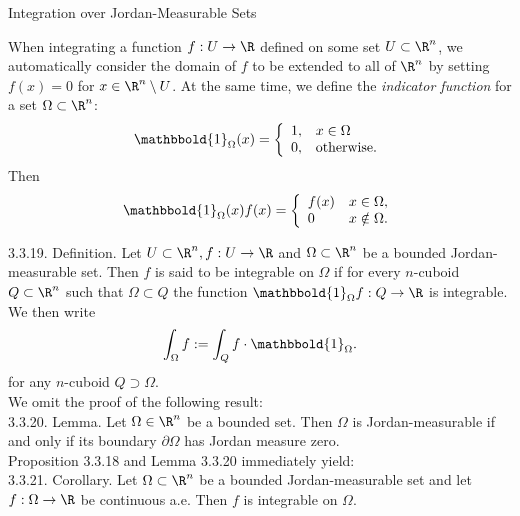\documentclass[smaller,hyperref={CJKbookmarks=true}]{beamer}
\begin{document}
\begin{frame}{Integration over Jordan-Measurable Sets}
\begin{spacing}{1.15}
When integrating a function $f:U\to\R$ defined on some set $U\subset\R^n$, we automatically consider the domain of $f$ to be extended to all of $\R^n$ by setting $f(x)=0$ for $x\in\R^n\setminus U$. At the same time, we define the \emph{indicator function} for a set $\Omega\subset\R^n$:
\[\mathbbold{1}_\Omega(x)=\left\{\begin{array}{ll}
                                   1, &x\in\Omega \\
                                   0, & \text{otherwise.}
                                 \end{array}\right.\]
Then
\[\mathbbold{1}_\Omega(x)f(x)=\left\{\begin{array}{ll}
                                       f(x) &x\in\Omega, \\
                                       0 & x\notin\Omega.
                                     \end{array}\right.\]
\end{spacing}
\newpage
\begin{spacing}{1.05}
\alert{3.3.19. Definition.} Let
$U\subset\R^n,f:U\to\R$ and
$\Omega\subset\R^n$ be a bounded
Jordan-measurable set. Then $f$ is
said to be integrable on $\Omega$ if
for every $n$-cuboid $Q\subset\R^n$
such that $\Omega\subset Q$ the
function $\mathbbold{1}_\Omega
f:Q\to\R$ is integrable. We then
write
\[\int_\Omega
f:=\int_Qf\cdot\mathbbold{1}_\Omega.\]
for any $n$-cuboid
$Q\supset\Omega$.\\[4pt]
We omit the proof of the following
result:\\[4pt]
\alert{3.3.20. Lemma.} Let
$\Omega\in\R^n$ be a bounded set.
Then $\Omega$ is Jordan-measurable
if and only if its boundary
$\partial\Omega$ has Jordan measure
zero.\\[3pt]
Proposition 3.3.18 and Lemma 3.3.20
immediately yield:\\[3pt]
\alert{3.3.21. Corollary.} Let
$\Omega\subset\R^n$ be a bounded
Jordan-measurable set and let
$f:\Omega\to\R$ be continuous a.e.
Then $f$ is integrable on $\Omega$.
\end{spacing}
\end{frame}
\end{document}
